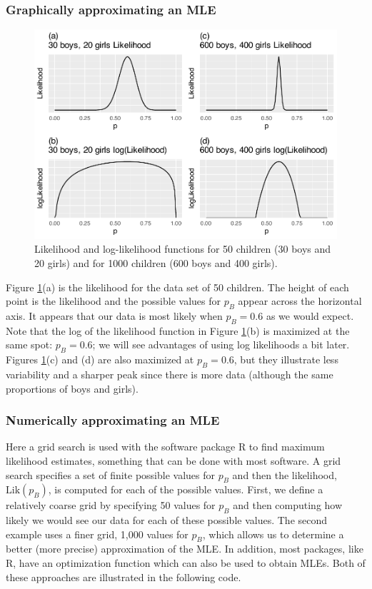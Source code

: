 \documentclass[
]{krantz}
\newcommand{\Lik}{\mathrm{Lik}}
\begin{document}
\subsubsection{Graphically approximating an MLE}\label{MLEgph.sec}

\begin{figure}

{\centering \includegraphics[width=0.9\linewidth]{bookdown-BeyondMLR_files/figure-latex/lik4-1} 

}

\caption{Likelihood and log-likelihood functions for 50 children (30 boys and 20 girls) and for 1000 children (600 boys and 400 girls).}\label{fig:lik4}
\end{figure}

Figure \ref{fig:lik4}(a) is the likelihood for the data set of 50 children. The height of each point is the likelihood and the possible values for \(p_B\) appear across the horizontal axis. It appears that our data is most likely when \(p_B = 0.6\) as we would expect. Note that the log of the likelihood function in Figure \ref{fig:lik4}(b) is maximized at the same spot: \(p_B = 0.6\); we will see advantages of using log likelihoods a bit later. Figures \ref{fig:lik4}(c) and (d) are also maximized at \(p_B = 0.6\), but they illustrate less variability and a sharper peak since there is more data (although the same proportions of boys and girls).

\subsubsection{Numerically approximating an MLE}\label{numerically-approximating-an-mle}

Here a grid search is used with the software package R to find maximum likelihood estimates, something that can be done with most software. A grid search specifies a set of finite possible values for \(p_B\) and then the likelihood, \(\Lik(p_B)\), is computed for each of the possible values. First, we define a relatively coarse grid by specifying 50 values for \(p_B\) and then computing how likely we would see our data for each of these possible values. The second example uses a finer grid, 1,000 values for \(p_B\), which allows us to determine a better (more precise) approximation of the MLE. In addition, most packages, like R, have an optimization function which can also be used to obtain MLEs. Both of these approaches are illustrated in the following code.
\end{document}
